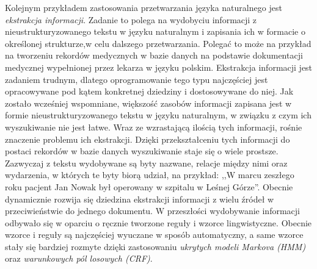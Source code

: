 \documentclass[a4paper, twoside, 12pt]{report}
\begin{document}
            Kolejnym przykładem zastosowania przetwarzania języka naturalnego jest \emph{ekstrakcja informacji}. Zadanie
            to polega na wydobyciu informacji z nieustrukturyzowanego tekstu w języku naturalnym i zapisania ich w
            formacie o określonej strukturze,w celu dalszego
            przetwarzania. Polegać to może na przykład na tworzeniu rekordów medycznych w bazie danych na podstawie
            dokumentacji medycznej wypełnionej przez lekarza w języku polskim. Ekstrakcja informacji jest zadaniem
            trudnym, dlatego oprogramowanie tego typu najczęściej jest opracowywane pod kątem konkretnej dziedziny i
            dostosowywane do niej. Jak zostało wcześniej wspomniane, większość zasobów informacji zapisana jest w
            formie nieustrukturyzowanego tekstu w języku naturalnym, w związku z czym ich wyszukiwanie nie jest łatwe.
            Wraz ze wzrastającą ilością tych informacji, rośnie znaczenie problemu ich ekstrakcji. Dzięki
            przekształceniu tych informacji do postaci rekordów w bazie danych wyszukiwanie staje się o wiele prostsze.
            Zazwyczaj z tekstu wydobywane są byty nazwane, relacje między nimi oraz wydarzenia, w których te byty
            biorą udział, na przykład: ,,W marcu zeszłego roku pacjent Jan Nowak był operowany w szpitalu w Leśnej
            Górze''. Obecnie dynamicznie rozwija się dziedzina ekstrakcji informacji z wielu źródeł w przeciwieństwie
            do jednego dokumentu. W przeszłości wydobywanie informacji odbywało się w oparciu o ręcznie tworzone
            reguły i wzorce lingwistyczne. Obecnie wzorce i reguły są najczęściej wyuczane w sposób automatyczny,
            a same wzorce stały się bardziej rozmyte dzięki zastosowaniu \emph{ukrytych modeli Markova (HMM)} oraz
            \emph{warunkowych pól losowych (CRF)}\cite{INFORMATIONEXTRACTION}.
\end{document}
